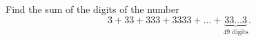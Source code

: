 Find the sum of the digits of the number
\[
3+33+333+3333+\dots+\underbrace{33\ldots3}_{49\text{ digits}} .
\]
